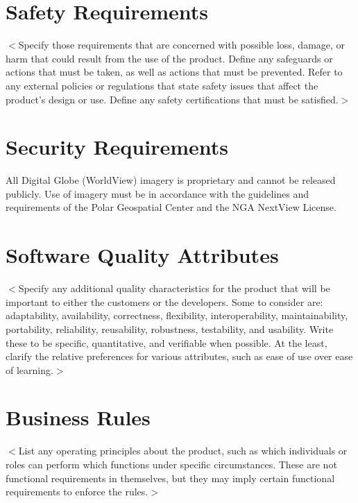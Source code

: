 \documentclass{scrreprt}
\begin{document}
\section{Safety Requirements}
$<$Specify those requirements that are concerned with possible loss, damage, or 
harm that could result from the use of the product. Define any safeguards or 
actions that must be taken, as well as actions that must be prevented. Refer to 
any external policies or regulations that state safety issues that affect the 
product’s design or use. Define any safety certifications that must be 
satisfied.$>$

\section{Security Requirements}

All Digital Globe (WorldView) imagery is proprietary and cannot be released publicly. 
Use of imagery must be in accordance with the guidelines and requirements of the Polar 
Geospatial Center and the NGA NextView License. 

\section{Software Quality Attributes}
$<$Specify any additional quality characteristics for the product that will be 
important to either the customers or the developers. Some to consider are: 
adaptability, availability, correctness, flexibility, interoperability, 
maintainability, portability, reliability, reusability, robustness, testability, 
and usability. Write these to be specific, quantitative, and verifiable when 
possible. At the least, clarify the relative preferences for various attributes, 
such as ease of use over ease of learning.$>$

\section{Business Rules}
$<$List any operating principles about the product, such as which individuals or 
roles can perform which functions under specific circumstances. These are not 
functional requirements in themselves, but they may imply certain functional 
requirements to enforce the rules.$>$
\end{document}

